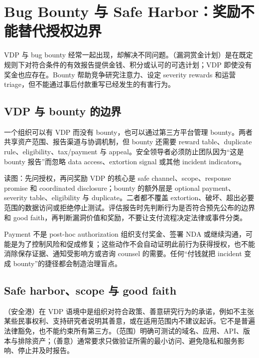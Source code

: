 \section{Bug Bounty 与 Safe Harbor：奖励不能替代授权边界}

VDP 与 bug bounty 经常一起出现，却解决不同问题。（漏洞赏金计划）是在既定规则下对符合条件的有效报告提供金钱、积分或认可的可选计划；VDP 即使没有奖金也应存在。Bounty 帮助竞争研究注意力、设定 severity rewards 和运营 triage，但不能通过事后付款重写已经发生的有害行为。

\subsection{VDP 与 bounty 的边界}

一个组织可以有 VDP 而没有 bounty，也可以通过第三方平台管理 bounty。两者共享资产范围、报告渠道与协调机制，但 bounty 还需要 reward table、duplicate rule、eligibility、tax/payment 与 appeal。安全领导者必须防止团队因为“这是 bounty 报告”而忽略 data access、extortion signal 或其他 incident indicators。


\begin{knowledgebox}{读图：先问授权，再问奖励}
VDP 的核心是 safe channel、scope、response promise 和 coordinated disclosure；bounty 的额外层是 optional payment、severity table、eligibility 与 duplicate。二者都不覆盖 extortion、破坏、超出必要范围的数据访问或拒绝停止测试。评估报告时先判断行为是否符合预先公布的边界和 good faith，再判断漏洞价值和奖励，不要让支付流程决定法律或事件分类。
\end{knowledgebox}

\begin{warningbox}{Payment 不是 post-hoc authorization}
组织支付奖金、签署 NDA 或继续沟通，可能是为了控制风险和促成修复；这些动作不会自动证明此前行为获得授权，也不能消除保存证据、通知受影响方或咨询 counsel 的需要。任何“付钱就把 incident 变成 bounty”的捷径都会制造治理盲点。
\end{warningbox}

\subsection{Safe harbor、scope 与 good faith}

（安全港）在 VDP 语境中是组织对符合政策、善意研究行为的承诺，例如不主张某些民事权利、支持研究者说明其善意，或在适用范围内不建议起诉。它不是普遍法律豁免，也不能约束所有第三方。（范围）明确可测试的域名、应用、API、版本与排除资产；（善意）通常要求只做验证所需的最小访问、避免隐私和服务影响、停止并及时报告。

